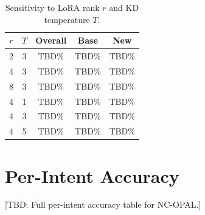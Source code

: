 \documentclass[11pt]{article}
\begin{document}
\begin{table}[h]
\centering
\small
\caption{Sensitivity to LoRA rank $r$ and KD temperature $T$.}
\label{tab:sensitivity}
\begin{tabular}{@{}cc|ccc@{}}
\toprule
$r$ & $T$ & \textbf{Overall} & \textbf{Base} & \textbf{New} \\
\midrule
2 & 3 & TBD\% & TBD\% & TBD\% \\
4 & 3 & TBD\% & TBD\% & TBD\% \\
8 & 3 & TBD\% & TBD\% & TBD\% \\
\midrule
4 & 1 & TBD\% & TBD\% & TBD\% \\
4 & 3 & TBD\% & TBD\% & TBD\% \\
4 & 5 & TBD\% & TBD\% & TBD\% \\
\bottomrule
\end{tabular}
\end{table}

\section{Per-Intent Accuracy}
\label{app:perintent}

[TBD: Full per-intent accuracy table for NC-OPAL.]
\end{document}
